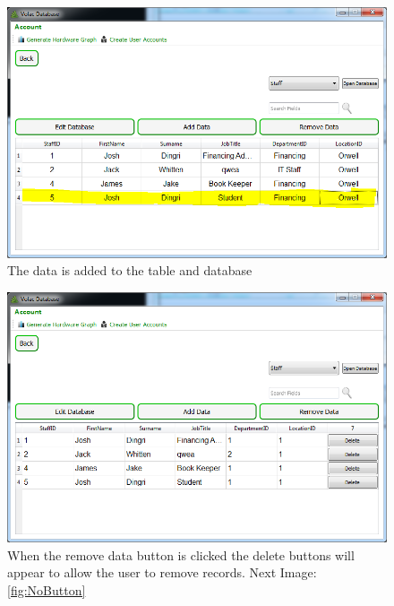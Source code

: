 \begin{figure}[H]
    \includegraphics[width=\textwidth]{./Testing/Images/AddedData.png}
    \caption{The data is added to the table and database} \label{fig:AddedData}
\end{figure}

\begin{figure}[H]
    \includegraphics[width=\textwidth]{./Testing/Images/RemoveDataButtons.png}
    \caption{When the remove data button is clicked the delete buttons will appear to allow the user to remove records. Next Image: \ref{fig:NoButton}} \label{fig:RemoveDataButtons}
\end{figure}


